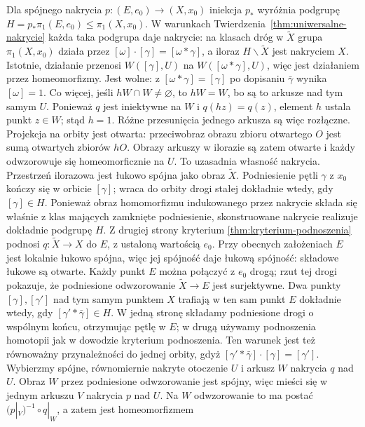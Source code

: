 \begin{uwaga}
\label{uwaga:nakrycia-podgrupy}
Dla spójnego nakrycia $p:(E,e_0)\to(X,x_0)$
iniekcja $p_*$ wyróżnia podgrupę
$H=p_*\pi_1(E,e_0)\leq\pi_1(X,x_0)$.
W warunkach Twierdzenia~\ref{thm:uniwersalne-nakrycie}
każda taka podgrupa daje nakrycie:
na klasach dróg w $\widetilde X$ grupa
$\pi_1(X,x_0)$ działa przez
$[\omega]\cdot[\gamma]=[\omega*\gamma]$,
a iloraz $H\backslash\widetilde X$
jest nakryciem $X$. Istotnie, działanie przenosi
$W([\gamma],U)$ na $W([\omega*\gamma],U)$,
więc jest działaniem przez homeomorfizmy. Jest wolne:
z $[\omega*\gamma]=[\gamma]$ po dopisaniu $\bar\gamma$
wynika $[\omega]=1$.
Co więcej, jeśli $hW\cap W\ne\varnothing$, to $hW=W$,
bo są to arkusze nad tym samym $U$. Ponieważ $q$ jest
iniektywne na $W$ i $q(hz)=q(z)$, element $h$ ustala punkt $z\in W$;
stąd $h=1$. Różne przesunięcia jednego arkusza są więc rozłączne.
Projekcja na orbity jest otwarta: przeciwobraz obrazu zbioru
otwartego $O$ jest sumą otwartych zbiorów $hO$.
Obrazy arkuszy w ilorazie są zatem otwarte i każdy odwzorowuje się
homeomorficznie na $U$. To uzasadnia własność nakrycia.
Przestrzeń ilorazowa jest łukowo spójna jako obraz $\widetilde X$.
Podniesienie pętli $\gamma$ z $x_0$ kończy się w orbicie $[\gamma]$;
wraca do orbity drogi stałej dokładnie wtedy, gdy $[\gamma]\in H$.
Ponieważ obraz homomorfizmu indukowanego przez nakrycie składa się
właśnie z klas mających zamknięte podniesienie, skonstruowane nakrycie
realizuje dokładnie podgrupę $H$.
Z drugiej strony kryterium
\ref{thm:kryterium-podnoszenia} podnosi
$q:\widetilde X\to X$ do $E$, z ustaloną wartością $e_0$.
Przy obecnych założeniach $E$ jest lokalnie łukowo spójna,
więc jej spójność daje łukową spójność: składowe łukowe są otwarte.
Każdy punkt $E$ można połączyć z $e_0$ drogą; rzut tej drogi
pokazuje, że podniesione odwzorowanie $\widetilde X\to E$ jest surjektywne.
Dwa punkty $[\gamma],[\gamma']$ nad tym samym punktem $X$
trafiają w ten sam punkt $E$
dokładnie wtedy, gdy $[\gamma'*\bar\gamma]\in H$.
W jedną stronę składamy podniesione drogi o wspólnym końcu,
otrzymując pętlę w $E$; w drugą używamy podnoszenia homotopii
jak w dowodzie kryterium podnoszenia. Ten warunek jest też
równoważny przynależności do jednej orbity, gdyż
$[\gamma'*\bar\gamma]\cdot[\gamma]=[\gamma']$.
Wybierzmy spójne, równomiernie nakryte otoczenie $U$
i arkusz $W$ nakrycia $q$ nad $U$. Obraz $W$ przez
podniesione odwzorowanie jest spójny, więc mieści się
w jednym arkuszu $V$ nakrycia $p$ nad $U$.
Na $W$ odwzorowanie to ma postać
$(p|_V)^{-1}\circ q|_W$, a zatem jest homeomorfizmem

\end{uwaga}
